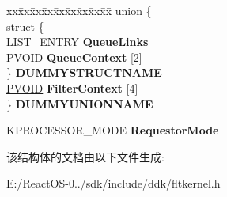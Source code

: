 \begin{DoxyCompactItemize}
\mbox{\label{struct___f_l_t___c_a_l_l_b_a_c_k___d_a_t_a_a0e649e6e8ad339eb976260ac4a63642b}} 
\begin{tabbing}
xx\=xx\=xx\=xx\=xx\=xx\=xx\=xx\=xx\=\kill
union \{\\
\>struct \{\\
\>\>\hyperlink{struct___l_i_s_t___e_n_t_r_y}{LIST\_ENTRY} {\bfseries QueueLinks}\\
\>\>\hyperlink{interfacevoid}{PVOID} {\bfseries QueueContext} \mbox{[}2\mbox{]}\\
\>\} {\bfseries DUMMYSTRUCTNAME}\\
\>\hyperlink{interfacevoid}{PVOID} {\bfseries FilterContext} \mbox{[}4\mbox{]}\\
\} {\bfseries DUMMYUNIONNAME}\\

\end{tabbing}\item 
\mbox{\label{struct___f_l_t___c_a_l_l_b_a_c_k___d_a_t_a_a8dcb3ba8ddb9c691b9da11d3548508de}} 
K\+P\+R\+O\+C\+E\+S\+S\+O\+R\+\_\+\+M\+O\+DE {\bfseries Requestor\+Mode}
\end{DoxyCompactItemize}


该结构体的文档由以下文件生成\+:\begin{DoxyCompactItemize}
\item 
E\+:/\+React\+O\+S-\/0../sdk/include/ddk/fltkernel.\+h\end{DoxyCompactItemize}
